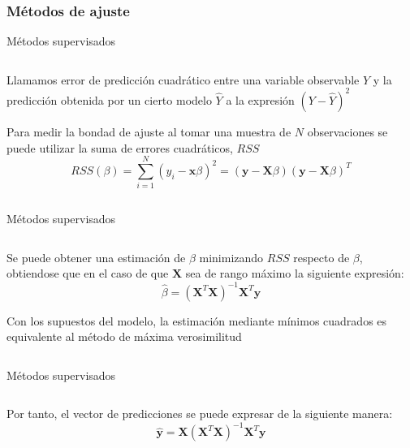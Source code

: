 \subsubsection{Métodos de ajuste}
\begin{frame}{Métodos supervisados}
\begin{columns}
\begin{column}{0.9\textwidth}
\begin{defi}
Llamamos error de predicción cuadrático entre una variable observable $Y$ y la predicción obtenida por un cierto modelo $\hat{Y}$ a la expresión $(Y-\hat{Y})^2$
\end{defi}
Para medir la bondad de ajuste al tomar una muestra de $N$ observaciones se puede utilizar la suma de errores cuadráticos, $RSS$
\begin{equation}
RSS(\beta)=\sum_{i=1}^N(y_i-\mathbf{x}\beta)^2=(\mathbf{y}-\mathbf{X}\beta)(\mathbf{y}-\mathbf{X}\beta)^T
\end{equation}
\end{column}
\end{columns}
\end{frame}



\begin{frame}{Métodos supervisados}
\begin{columns}
\begin{column}{0.9\textwidth}
Se puede obtener una estimación de $\beta$ minimizando $RSS$ respecto de $\beta$, obtiendose que en el caso de que $\mathbf{X}$ sea de rango máximo la siguiente expresión:
\begin{equation}
\hat{\beta}=(\mathbf{X}^T\mathbf{X})^{-1}\mathbf{X}^T \mathbf{y}
\end{equation}
\begin{propo}
Con los supuestos del modelo, la estimación mediante mínimos cuadrados es equivalente  al método de máxima verosimilitud
\end{propo}
\end{column}
\end{columns}
\end{frame}


\begin{frame}{Métodos supervisados}
\begin{columns}
\begin{column}{0.9\textwidth}
Por tanto, el vector de predicciones se puede expresar de la siguiente manera:
\begin{equation}
\mathbf{\hat{y}}= \mathbf{X}(\mathbf{X}^T\mathbf{X})^{-1}\mathbf{X}^T \mathbf{y}
\end{equation}
\end{column}
\end{columns}
\end{frame}



